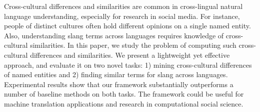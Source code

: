 Cross-cultural differences and similarities are common in cross-lingual natural language understanding, especially for research in social media. For instance, people of distinct cultures often hold different opinions on a single named entity. Also, understanding slang terms across languages requires knowledge of cross-cultural similarities.  In this paper, we study the problem of computing such cross-cultural differences and similarities. We present a lightweight yet effective approach, and evaluate it on two novel tasks: 1) mining cross-cultural differences of named entities and 2) finding similar terms for slang across languages.  Experimental results show that our framework substantially outperforms a number of baseline methods on both tasks. The framework could be useful for machine translation applications and research in computational social science.
